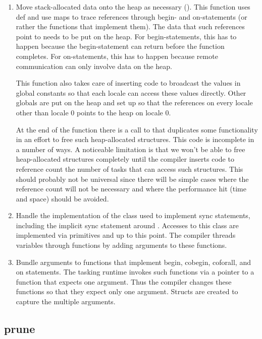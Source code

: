 \documentclass[10pt]{article}
\begin{document}
\begin{enumerate}
\item Move stack-allocated data onto the heap as necessary
  ().  This function uses def and use maps to
  trace references through begin- and on-statements (or rather the
  functions that implement them).  The data that such references point
  to needs to be put on the heap.  For begin-statements, this has to
  happen because the begin-statement can return before the function
  completes.  For on-statements, this has to happen because remote
  communication can only involve data on the heap.

  This function also takes care of inserting code to broadcast the
  values in global constants so that each locale can access these
  values directly.  Other globals are put on the heap and set up so
  that the references on every locale other than locale 0 points to
  the heap on locale 0.

  At the end of the function  there is a call
  to  that duplicates some functionality in
  an effort to free such heap-allocated structures.  This code is
  incomplete in a number of ways.  A noticeable limitation is that we
  won't be able to free heap-allocated structures completely until the
  compiler inserts code to reference count the number of tasks that
  can access such structures.  This should probably not be universal
  since there will be simple cases where the reference count will not
  be necessary and where the performance hit (time and space) should
  be avoided.

\item Handle the implementation of the  class used to
  implement sync statements, including the implicit sync statement
  around .  Accesses to this class are implemented via
  primitives  and  up to this
  point.  The compiler threads  variables through
  functions by adding arguments to these functions.

\item Bundle arguments to functions that implement begin, cobegin,
  coforall, and on statements.  The tasking runtime invokes such
  functions via a pointer to a function that expects one argument.
  Thus the compiler changes these functions so that they expect only
  one argument.  Structs are created to capture the multiple
  arguments.
\end{enumerate}

\subsection{prune}
\end{document}

